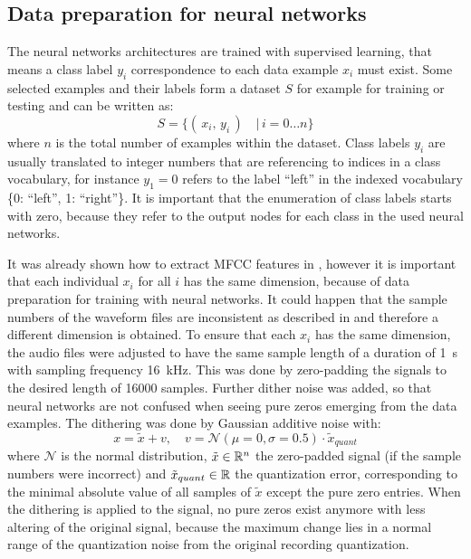 \subsection{Data preparation for neural networks}\label{sec:exp_data_prep}
The neural networks architectures are trained with supervised learning, that means a class label $y_i$ correspondence to each data example $x_i$ must exist.
Some selected examples and their labels form a dataset $S$ for example for training or testing and can be written as:
\begin{equation}\label{eq:exp_dataset}
  S = \{ (\,x_i, \, y_i\,) \quad | \, i = 0 \dots n \}
\end{equation}
where $n$ is the total number of examples within the dataset.
Class labels $y_i$ are usually translated to integer numbers that are referencing to indices in a class vocabulary, for instance $y_1 = 0$ refers to the label \enquote{left} in the indexed vocabulary \{0: \enquote{left}, 1: \enquote{right}\}.
It is important that the enumeration of class labels starts with zero, because they refer to the output nodes for each class in the used neural networks.

It was already shown how to extract MFCC features in , however it is important that each individual $x_i$ for all $i$ has the same dimension, because of data preparation for training with neural networks.
It could happen that the sample numbers of the waveform files are inconsistent as described in  and therefore a different dimension is obtained.
To ensure that each $x_i$ has the same dimension, the audio files were adjusted to have the same sample length of a duration of \SI{1}{\second} with sampling frequency \SI{16}{\kilo\hertz}.
This was done by zero-padding the signals to the desired length of 16000 samples.
Further dither noise was added, so that neural networks are not confused when seeing pure zeros emerging from the data examples.
The dithering was done by Gaussian additive noise with:
\begin{equation}\label{eq:exp_dither}
  x = \tilde{x} + v, \quad v = \mathcal{N}(\mu=0, \sigma=0.5) \cdot \tilde{x}_{quant}%
\end{equation}
where $\mathcal{N}$ is the normal distribution, $\tilde{x} \in \mathbb{R}^n$ the zero-padded signal (if the sample numbers were incorrect) and $\tilde{x}_{quant} \in \mathbb{R}$ the quantization error, corresponding to the minimal absolute value of all samples of $\tilde{x}$ except the pure zero entries.
When the dithering is applied to the signal, no pure zeros exist anymore with less altering of the original signal, because the maximum change lies in a normal range of the quantization noise from the original recording quantization.


